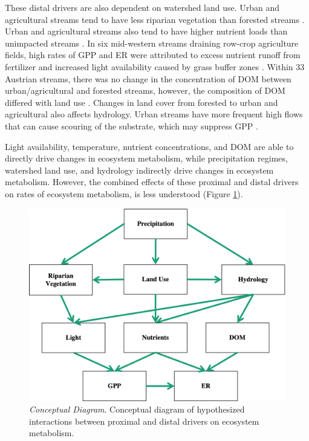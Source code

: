 These distal drivers are also dependent on watershed land use. Urban and agricultural streams tend to have less riparian vegetation than forested streams \cite{bernot_inter-regional_2010}. Urban and agricultural streams also tend to have higher nutrient loads than unimpacted streams \cite{bernot_inter-regional_2010, alberts_watershed_2017, fus_land_2017}. In six mid-western streams draining row-crop agriculture fields, high rates of GPP and ER were attributed to excess nutrient runoff from fertilizer and increased light availability caused by grass buffer zones \cite{griffithsAgriculturalLandUse2013}. Within 33 Austrian streams, there was no change in the concentration of DOM between urban/agricultural and forested streams, however, the composition of DOM differed with land use \cite{fus_land_2017}. Changes in land cover from forested to urban and agricultural also affects hydrology. Urban streams have more frequent high flows that can cause scouring of the substrate, which may suppress GPP \cite{booth_urbanization_1997, blaszczak_scoured_2019, uehlinger_resistance_2000, uehlingerEcosystemMetabolismDisturbance1998}. 

Light availability, temperature, nutrient concentrations, and DOM are able to directly drive changes in ecosystem metabolism, while precipitation regimes, watershed land use, and hydrology indirectly drive changes in ecosystem metabolism. However, the combined effects of these proximal and distal drivers on rates of ecosystem metabolism, is less understood (Figure \ref{fig:concept}).


\begin{figure}[htb]
\begin{center}
\includegraphics[scale=0.6]{Figs/ConceptDiagGREEN.png}
\caption[Conceptual Diagram]{\textit{Conceptual Diagram}. Conceptual diagram of hypothesized interactions between proximal and distal drivers on ecosystem metabolism.}
\label{fig:concept}
\end{center}
\end{figure}



